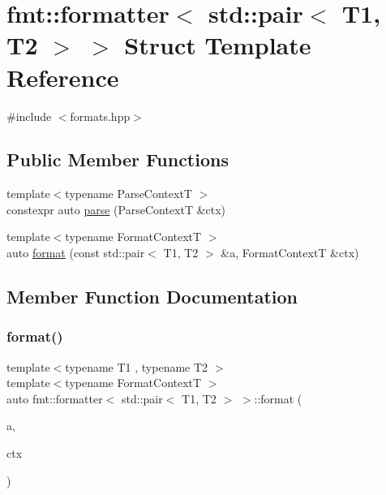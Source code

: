 \hypertarget{structfmt_1_1formatter_3_01std_1_1pair_3_01_t1_00_01_t2_01_4_01_4}{}\section{fmt\+:\+:formatter$<$ std\+:\+:pair$<$ T1, T2 $>$ $>$ Struct Template Reference}
\label{structfmt_1_1formatter_3_01std_1_1pair_3_01_t1_00_01_t2_01_4_01_4}


{\ttfamily \#include $<$formats.\+hpp$>$}

\subsection*{Public Member Functions}
\begin{DoxyCompactItemize}
\item 
{\footnotesize template$<$typename Parse\+ContextT $>$ }\\constexpr auto \mbox{\hyperlink{structfmt_1_1formatter_3_01std_1_1pair_3_01_t1_00_01_t2_01_4_01_4_ac5fc19d6b6aea0133abb1f03c7158b76}{parse}} (Parse\+ContextT \&ctx)
\item 
{\footnotesize template$<$typename Format\+ContextT $>$ }\\auto \mbox{\hyperlink{structfmt_1_1formatter_3_01std_1_1pair_3_01_t1_00_01_t2_01_4_01_4_aabf0a70859e47ab2d65b81658503f4aa}{format}} (const std\+::pair$<$ T1, T2 $>$ \&a, Format\+ContextT \&ctx)
\end{DoxyCompactItemize}


\subsection{Member Function Documentation}
\mbox{\label{structfmt_1_1formatter_3_01std_1_1pair_3_01_t1_00_01_t2_01_4_01_4_aabf0a70859e47ab2d65b81658503f4aa}} 
\subsubsection{\texorpdfstring{format()}{format()}}
{\footnotesize\ttfamily template$<$typename T1 , typename T2 $>$ \\
template$<$typename Format\+ContextT $>$ \\
auto fmt\+::formatter$<$ std\+::pair$<$ T1, T2 $>$ $>$\+::format (\begin{DoxyParamCaption}\item[{const std\+::pair$<$ T1, T2 $>$ \&}]{a,  }\item[{Format\+ContextT \&}]{ctx }\end{DoxyParamCaption})}

